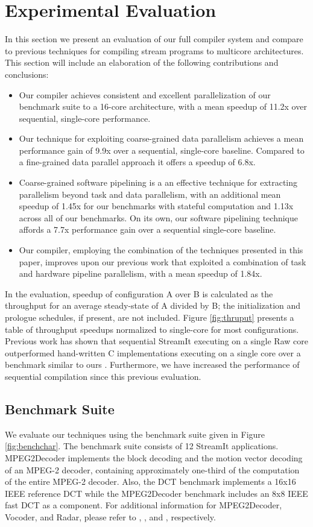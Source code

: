 \section{Experimental Evaluation}
\label{sec:results}
In this section we present an evaluation of our full compiler system
and compare to previous techniques for compiling stream programs to
multicore architectures.  This section will include an elaboration of
the following contributions and conclusions:

\begin{itemize}
\item Our compiler achieves consistent and excellent parallelization of our
benchmark suite to a 16-core architecture, with a mean speedup of 
11.2x over sequential, single-core performance.
\item Our technique for exploiting coarse-grained data parallelism
achieves a mean performance gain of 9.9x over a sequential,
single-core baseline.  Compared to a fine-grained data parallel
approach it offers a speedup of 6.8x.
\item Coarse-grained software pipelining is a
an effective technique for extracting parallelism beyond task and data
parallelism, with an additional mean speedup of 1.45x for
our benchmarks with stateful computation and 1.13x across all of our
benchmarks. On its own, our software pipelining technique affords a
7.7x performance gain over a sequential single-core baseline.
\item Our compiler, employing the combination of the techniques
presented in this paper, improves upon our previous work that
exploited a combination of task and hardware pipeline parallelism,
with a mean speedup of 1.84x.
\end{itemize}

In the evaluation, speedup of configuration A over B is calculated as
the throughput for an average steady-state of A divided by B; the
initialization and prologue schedules, if present, are not
included. Figure \ref{fig:thruput} presents a table of throughput
speedups normalized to single-core for most configurations.  Previous
work has shown that sequential StreamIt executing on a single Raw core
outperformed hand-written C implementations executing on a single core
over a benchmark similar to ours \cite{raw_isca}. Furthermore, we have
increased the performance of sequential compilation since this
previous evaluation.

\subsection{Benchmark Suite}
We evaluate our techniques using the benchmark suite given in Figure
\ref{fig:benchchar}.   The benchmark suite consists of 12 StreamIt
applications. MPEG2Decoder implements the block decoding and the
motion vector decoding of an MPEG-2 decoder, containing approximately
one-third of the computation of the entire MPEG-2 decoder.  Also, the
DCT benchmark implements a 16x16 IEEE reference DCT while the
MPEG2Decoder benchmark includes an 8x8 IEEE fast DCT as a component.
For additional information for MPEG2Decoder, Vocoder, and Radar,
please refer to \cite{ipdps2006},
\cite{seneff80}, and \cite{pca}, respectively. 

